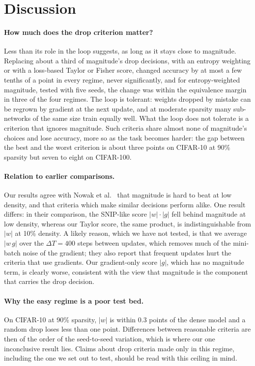 \section{Discussion}
\label{sec:discussion}

\paragraph{How much does the drop criterion matter?} Less than its role in the loop suggests, as long as it stays close to magnitude. Replacing about a third of magnitude's drop decisions, with an entropy weighting or with a loss-based Taylor or Fisher score, changed accuracy by at most a few tenths of a point in every regime, never significantly, and for entropy-weighted magnitude, tested with five seeds, the change was within the equivalence margin in three of the four regimes. The loop is tolerant: weights dropped by mistake can be regrown by gradient at the next update, and at moderate sparsity many sub-networks of the same size train equally well. What the loop does not tolerate is a criterion that ignores magnitude. Such criteria share almost none of magnitude's choices and lose accuracy, more so as the task becomes harder: the gap between the best and the worst criterion is about three points on CIFAR-10 at 90\% sparsity but seven to eight on CIFAR-100.

\paragraph{Relation to earlier comparisons.} Our results agree with Nowak et al.\ \cite{nowak2023fantastic} that magnitude is hard to beat at low density, and that criteria which make similar decisions perform alike. One result differs: in their comparison, the SNIP-like score $|w|\cdot|g|$ fell behind magnitude at low density, whereas our Taylor score, the same product, is indistinguishable from $|w|$ at 10\% density. A likely reason, which we have not tested, is that we average $|w\,g|$ over the $\Delta T=400$ steps between updates, which removes much of the mini-batch noise of the gradient; they also report that frequent updates hurt the criteria that use gradients. Our gradient-only score $|g|$, which has no magnitude term, is clearly worse, consistent with the view that magnitude is the component that carries the drop decision.

\paragraph{Why the easy regime is a poor test bed.} On CIFAR-10 at 90\% sparsity, $|w|$ is within 0.3 points of the dense model and a random drop loses less than one point. Differences between reasonable criteria are then of the order of the seed-to-seed variation, which is where our one inconclusive result lies. Claims about drop criteria made only in this regime, including the one we set out to test, should be read with this ceiling in mind.

